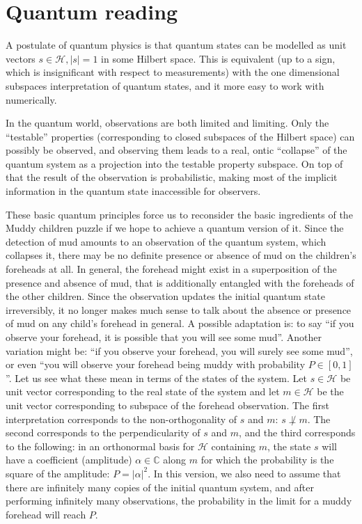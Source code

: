 \documentclass[a4paper]{article}
\newcommand{\HH}{\mathcal{H}}
\begin{document}
\section*{Quantum reading}
A postulate of quantum physics is that quantum states can be modelled as unit 
vectors
$s \in \mathcal{H}, |s| = 1$ in some Hilbert space. This is equivalent (up to a
sign, which is insignificant with respect to measurements) with the one
dimensional subspaces interpretation of quantum states, and it more easy to work
with numerically.

In the quantum world, observations are both limited and limiting. Only the
``testable'' properties (corresponding to closed subspaces of the Hilbert space) 
can possibly be observed, and observing them leads to a real, ontic ``collapse''
of the quantum system as a projection into the testable property subspace. On
top of that the result of the observation is probabilistic, making most of the
implicit information in the quantum state inaccessible for observers.

These basic quantum principles force us to reconsider the basic ingredients of
the Muddy children puzzle if we hope to achieve a quantum version of it. Since
the detection of mud amounts to an observation of the quantum system, which
collapses it, there may be no definite presence or absence of mud on the
children's foreheads at all. In general, the forehead might exist in a
superposition of the presence and absence of mud, that is additionally entangled
with the foreheads of the other children. Since the observation updates the
initial quantum state irreversibly, it no longer makes much sense to talk about
the absence or presence of mud on any child's forehead in general. A possible
adaptation is: to say ``if you observe your forehead, it is possible that you
will see some mud''. Another variation might be: ``if you observe your forehead,
you will surely see some mud'', or even ``you will observe your forehead being
muddy with probability $P \in [0, 1]$''. Let us see what these mean in terms of
the states of the system. Let $s \in \HH$ be unit vector corresponding to the 
real state of the system and let $m \in \HH$ be the unit vector corresponding to
subspace of the forehead observation. The first interpretation corresponds to
the non-orthogonality of $s$ and $m$: $s \not\perp m$. The second corresponds to
the perpendicularity of $s$ and $m$, and the third corresponds to the following:
in an orthonormal basis for $\HH$ containing $m$, the state $s$ will have a
coefficient (amplitude) $\alpha \in \mathbb{C}$ along $m$ for which the
probability is the square of the amplitude: $P = |\alpha|^2$. In this version,
we also need to assume that there are infinitely many copies of the initial
quantum system, and after performing infinitely many observations, the
probability in the limit for a muddy forehead will reach $P$.
\end{document}
